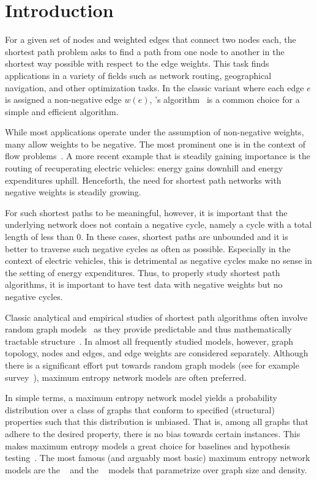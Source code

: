 \chapter{Introduction}\label{sec:introduction}

For a given set of nodes and weighted edges that connect two nodes each, the shortest path problem asks to find a path from one node to another in the shortest way possible with respect to the edge weights.
This task finds applications in a variety of fields such as network routing, geographical navigation, and other optimization tasks.
In the classic variant where each edge $e$ is assigned a non-negative edge $w(e)$, \algdk's algorithm~\cite{DBLP:journals/nm/Dijkstra59} is a common choice for a simple and efficient algorithm.

While most applications operate under the assumption of non-negative weights, many allow weights to be negative.
The most prominent one is in the context of flow problems~\cite{PotentialsOriginal}.
A more recent example that is steadily gaining importance is the routing of recuperating electric vehicles: energy gains downhill and energy expenditures uphill.
Henceforth, the need for shortest path networks with negative weights is steadily growing.

For such shortest paths to be meaningful, however, it is important that the underlying network does not contain a negative cycle, namely a cycle with a total length of less than $0$.
In these cases, shortest paths are unbounded and it is better to traverse such negative cycles as often as possible.
Especially in the context of electric vehicles, this is detrimental as negative cycles make no sense in the setting of energy expenditures.
Thus, to properly study shortest path algorithms, it is important to have test data with negative weights but no negative cycles.

Classic analytical and empirical studies of shortest path algorithms often involve random graph models~\cite{DBLP:journals/dam/FriezeG85,DBLP:journals/jea/BorassiN19} as they provide predictable and thus mathematically tractable structure~\cite{Barabasi2016-np,DBLP:books/cu/H2016}.
In almost all frequently studied models, however, graph topology, \ie nodes and edges, and edge weights are considered separately.
Although there is a significant effort put towards  random graph models (see for example survey~\cite{DBLP:journals/csur/DrobyshevskiyT20}), maximum entropy network models are often preferred.

In simple terms, a maximum entropy network model yields a probability distribution over a class of graphs that conform to specified (structural) properties such that this distribution is unbiased.
That is, among all graphs that adhere to the desired property, there is no bias towards certain instances.
This makes maximum entropy models a great choice for baselines and hypothesis testing~\cite{Milo824,gotelli1996null,Peixto15}.
The most famous (and arguably most basic) maximum entropy network models are the \Gnp~\cite{gilbert1959random} and the \Gnm~\cite{erdds1959random} models that parametrize over graph size and density.

